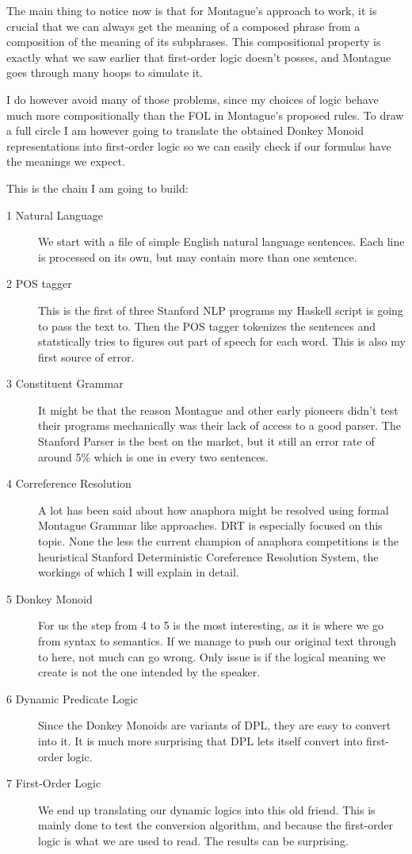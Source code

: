 \documentclass[12pt]{article}
\begin{document}
The main thing to notice now is that for Montague's approach to work, it is crucial that we can always get the meaning of a composed phrase from a composition of the meaning of its subphrases. This compositional property is exactly what we saw earlier that first-order logic doesn't posses, and Montague goes through many hoops to simulate it.

I do however avoid many of those problems, since my choices of logic behave much more compositionally than the FOL in Montague's proposed rules. To draw a full circle I am however going to translate the obtained Donkey Monoid representations into first-order logic so we can easily check if our formulas have the meanings we expect.

This is the chain I am going to build:

\begin{description}
\item[1 Natural Language] We start with a file of simple English natural language sentences. Each line is processed on its own, but may contain more than one sentence.

\item[2 POS tagger] This is the first of three Stanford NLP programs my Haskell script is going to pass the text to. Then the POS tagger tokenizes the sentences and statstically tries to figures out part of speech for each word. This is also my first source of error.

\item[3 Constituent Grammar] It might be that the reason Montague and other early pioneers didn't test their programs mechanically was their lack of access to a good parser. The Stanford Parser is the best on the market, but it still an error rate of around 5\% which is one in every two sentences.

\item[4 Correference Resolution] A lot has been said about how anaphora might be resolved using formal Montague Grammar like approaches. DRT is especially focused on this topic. None the less the current champion of anaphora competitions\cite{lee2011stanford}\cite{raghunathan2010multi} is the heuristical Stanford Deterministic Coreference Resolution System, the workings of which I will explain in detail.

\item[5 Donkey Monoid] For us the step from 4 to 5 is the most interesting, as it is where we go from syntax to semantics. If we manage to push our original text through to here, not much can go wrong. Only issue is if the logical meaning we create is not the one intended by the speaker.

\item[6 Dynamic Predicate Logic] Since the Donkey Monoids are variants of DPL, they are easy to convert into it. It is much more surprising that DPL lets itself convert into first-order logic.

\item[7 First-Order Logic] We end up translating our dynamic logics into this old friend. This is mainly done to test the conversion algorithm, and because the first-order logic is what we are used to read. The results can be surprising.
\end{description}
\end{document}
